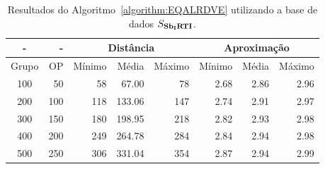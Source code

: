 \begin{table}[!htb]
  \caption{Resultados do Algoritmo~\ref{algorithm:EQALRDVE} utilizando a base de dados $S_{\textbf{Sb\textsubscript{I}RTI}}{}$.}
  \label{table:SANZHOMN}
  \centering
  \begin{tabular}{|c|r|r|r|r|r|r|r|}
    \hline
      -      &  -   & \multicolumn{3}{c|}{Distância}             & \multicolumn{3}{c|}{Aproximação}           \\ \hline
    Grupo    & OP   & Mínimo       & Média        & Máximo       & Mínimo       & Média        & Máximo       \\ \hline  
    100      & 50   & 58           &  67.00       & 78           & 2.68         & 2.86         & 2.96         \\ \hline
    200      & 100  & 118          & 133.06       & 147          & 2.74         & 2.91         & 2.97         \\ \hline
    300      & 150  & 180          & 198.95       & 218          & 2.82         & 2.93         & 2.98         \\ \hline
    400      & 200  & 249          & 264.78       & 284          & 2.84         & 2.94         & 2.98         \\ \hline
    500      & 250  & 306          & 331.04       & 354          & 2.87         & 2.94         & 2.99         \\ \hline    
  \end{tabular}
\end{table}
